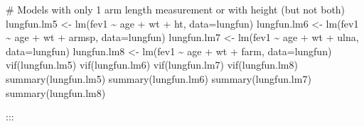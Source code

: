 \documentclass[
  letterpaper,
  DIV=11,
  numbers=noendperiod]{scrreprt}
\newenvironment{Shaded}{\begin{snugshade}}{\end{snugshade}}
\newcommand{\AttributeTok}[1]{\textcolor[rgb]{0.40,0.45,0.13}{#1}}
\newcommand{\CommentTok}[1]{\textcolor[rgb]{0.37,0.37,0.37}{#1}}
\newcommand{\FunctionTok}[1]{\textcolor[rgb]{0.28,0.35,0.67}{#1}}
\newcommand{\NormalTok}[1]{\textcolor[rgb]{0.00,0.23,0.31}{#1}}
\newcommand{\OtherTok}[1]{\textcolor[rgb]{0.00,0.23,0.31}{#1}}
\newcommand{\SpecialCharTok}[1]{\textcolor[rgb]{0.37,0.37,0.37}{#1}}
\begin{document}
\begin{Shaded}
\begin{Highlighting}[]
\CommentTok{\# Models with only 1 arm length measurement or with height (but not both)}
\NormalTok{lungfun.lm5 }\OtherTok{\textless{}{-}} \FunctionTok{lm}\NormalTok{(fev1 }\SpecialCharTok{\textasciitilde{}}\NormalTok{ age }\SpecialCharTok{+}\NormalTok{ wt }\SpecialCharTok{+}\NormalTok{ ht, }\AttributeTok{data=}\NormalTok{lungfun)}
\NormalTok{lungfun.lm6 }\OtherTok{\textless{}{-}} \FunctionTok{lm}\NormalTok{(fev1 }\SpecialCharTok{\textasciitilde{}}\NormalTok{ age }\SpecialCharTok{+}\NormalTok{ wt }\SpecialCharTok{+}\NormalTok{ armsp, }\AttributeTok{data=}\NormalTok{lungfun)}
\NormalTok{lungfun.lm7 }\OtherTok{\textless{}{-}} \FunctionTok{lm}\NormalTok{(fev1 }\SpecialCharTok{\textasciitilde{}}\NormalTok{ age }\SpecialCharTok{+}\NormalTok{ wt }\SpecialCharTok{+}\NormalTok{ ulna, }\AttributeTok{data=}\NormalTok{lungfun)}
\NormalTok{lungfun.lm8 }\OtherTok{\textless{}{-}} \FunctionTok{lm}\NormalTok{(fev1 }\SpecialCharTok{\textasciitilde{}}\NormalTok{ age }\SpecialCharTok{+}\NormalTok{ wt }\SpecialCharTok{+}\NormalTok{ farm, }\AttributeTok{data=}\NormalTok{lungfun)}
\FunctionTok{vif}\NormalTok{(lungfun.lm5)}
\FunctionTok{vif}\NormalTok{(lungfun.lm6)}
\FunctionTok{vif}\NormalTok{(lungfun.lm7)}
\FunctionTok{vif}\NormalTok{(lungfun.lm8)}
\FunctionTok{summary}\NormalTok{(lungfun.lm5)}
\FunctionTok{summary}\NormalTok{(lungfun.lm6)}
\FunctionTok{summary}\NormalTok{(lungfun.lm7)}
\FunctionTok{summary}\NormalTok{(lungfun.lm8)}
\end{Highlighting}
\end{Shaded}

:::
\end{document}
